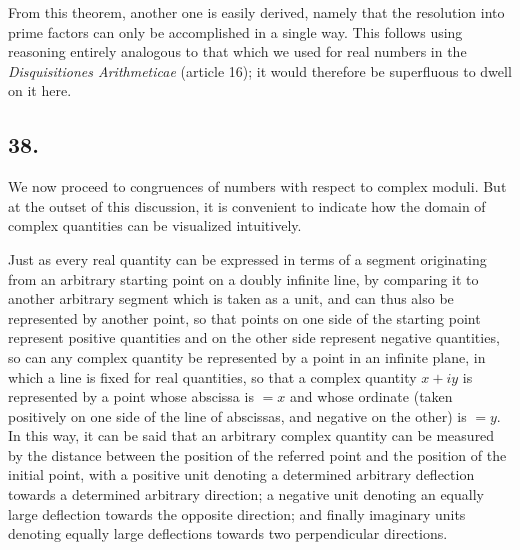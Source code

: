 \documentclass[twoside,12pt]{memoir}
\begin{document}
From this theorem, another one is easily derived, namely that the resolution into prime factors can only be accomplished in a single way. This follows using reasoning entirely analogous to that which we used for real numbers in the \textit{Disquisitiones Arithmeticae} (article 16); it would therefore be superfluous to dwell on it here.
%

\subsection*{38.}

We now proceed to congruences of numbers with respect to complex moduli. But at the outset of this discussion, it is convenient to indicate how the domain of complex quantities can be visualized intuitively.

Just as every real quantity can be expressed in terms of a segment originating from an arbitrary starting point on a doubly infinite line, by comparing it to another arbitrary segment which is taken as a unit, and can thus also be represented by another point, so that points on one side of the starting point represent positive quantities and on the other side represent negative quantities, so can any complex quantity be represented by a point in an infinite plane, in which a line is fixed for real quantities, so that a complex quantity \(x+i y\) is represented by a point whose abscissa is \(=x\) and whose ordinate (taken positively on one side of the line of abscissas, and negative on the other) is \(=y\). In this way, it can be said that an arbitrary complex quantity can be measured by the distance between the position of the referred point and the position of the initial point, with a positive unit denoting a determined arbitrary deflection towards a determined arbitrary direction; a negative unit denoting an equally large deflection towards the opposite direction; and finally imaginary units denoting equally large deflections towards two perpendicular directions.
%
\end{document}
